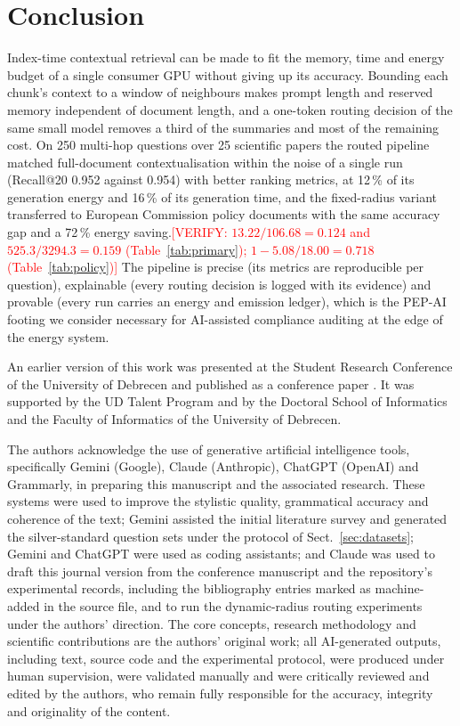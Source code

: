 \documentclass[pdflatex,sn-mathphys-num]{sn-jnl}
\makeatletter
\newcommand{\todo}[1]{\textcolor{red}{#1}}
\newcommand{\verify}[1]{\todo{[VERIFY: #1]}}
\newcommand{\Rec}[1]{Recall@#1}
\theoremstyle{thmstyleone}%
\theoremstyle{thmstylethree}%
\makeatother
\begin{document}
\section{Conclusion}\label{sec:conclusion}

Index-time contextual retrieval can be made to fit the memory, time and energy budget of a single consumer GPU without giving up its accuracy. Bounding each chunk's context to a window of neighbours makes prompt length and reserved memory independent of document length, and a one-token routing decision of the same small model removes a third of the summaries and most of the remaining cost. On 250 multi-hop questions over 25 scientific papers the routed pipeline matched full-document contextualisation within the noise of a single run (\Rec{20} 0.952 against 0.954) with better ranking metrics, at 12\,\% of its generation energy and 16\,\% of its generation time, and the fixed-radius variant transferred to European Commission policy documents with the same accuracy gap and a 72\,\% energy saving.\verify{$13.22/106.68=0.124$ and $525.3/3294.3=0.159$ (Table~\ref{tab:primary}); $1-5.08/18.00=0.718$ (Table~\ref{tab:policy})} The pipeline is precise (its metrics are reproducible per question), explainable (every routing decision is logged with its evidence) and provable (every run carries an energy and emission ledger), which is the PEP-AI footing we consider necessary for AI-assisted compliance auditing at the edge of the energy system.

\backmatter

An earlier version of this work was presented at the Student Research Conference of the University of Debrecen and published as a conference paper \cite{sandor2025documentslicecontextualretrieval}. It was supported by the UD Talent Program and by the Doctoral School of Informatics and the Faculty of Informatics of the University of Debrecen.

The authors acknowledge the use of generative artificial intelligence tools, specifically Gemini (Google), Claude (Anthropic), ChatGPT (OpenAI) and Grammarly, in preparing this manuscript and the associated research. These systems were used to improve the stylistic quality, grammatical accuracy and coherence of the text; Gemini assisted the initial literature survey and generated the silver-standard question sets under the protocol of Sect.~\ref{sec:datasets}; Gemini and ChatGPT were used as coding assistants; and Claude was used to draft this journal version from the conference manuscript and the repository's experimental records, including the bibliography entries marked as machine-added in the source file, and to run the dynamic-radius routing experiments under the authors' direction. The core concepts, research methodology and scientific contributions are the authors' original work; all AI-generated outputs, including text, source code and the experimental protocol, were produced under human supervision, were validated manually and were critically reviewed and edited by the authors, who remain fully responsible for the accuracy, integrity and originality of the content.
\end{document}
